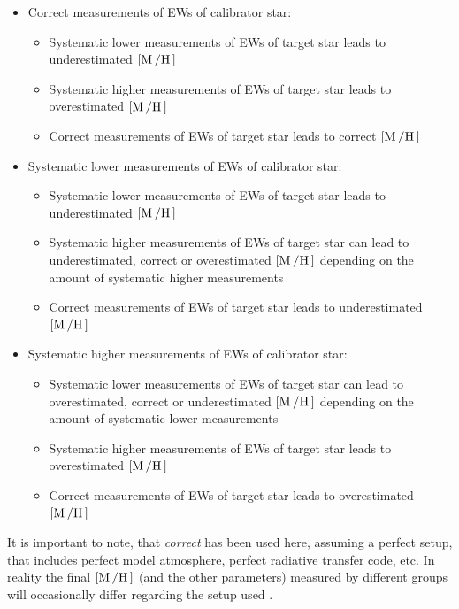 \begin{itemize}
  \item Correct measurements of EWs of calibrator star:
  \begin{itemize}
    \item Systematic lower measurements of EWs of target star leads to underestimated $[\ion{M}/\ion{H}]$
    \item Systematic higher measurements of EWs of target star leads to overestimated $[\ion{M}/\ion{H}]$
    \item Correct measurements of EWs of target star leads to correct $[\ion{M}/\ion{H}]$
  \end{itemize}
  \item Systematic lower measurements of EWs of calibrator star:
  \begin{itemize}
    \item Systematic lower measurements of EWs of target star leads to underestimated $[\ion{M}/\ion{H}]$
    \item Systematic higher measurements of EWs of target star can lead to underestimated, correct or
          overestimated $[\ion{M}/\ion{H}]$ depending on the amount of systematic higher measurements
    \item Correct measurements of EWs of target star leads to underestimated $[\ion{M}/\ion{H}]$
  \end{itemize}
  \item Systematic higher measurements of EWs of calibrator star:
  \begin{itemize}
    \item Systematic lower measurements of EWs of target star can lead to overestimated, correct or
          underestimated $[\ion{M}/\ion{H}]$ depending on the amount of systematic lower measurements
    \item Systematic higher measurements of EWs of target star leads to overestimated $[\ion{M}/\ion{H}]$
    \item Correct measurements of EWs of target star leads to overestimated $[\ion{M}/\ion{H}]$
  \end{itemize}
\end{itemize}
It is important to note, that \emph{correct} has been used here, assuming a perfect setup, that
includes perfect model atmosphere, perfect radiative transfer code, etc. In reality the final
$[\ion{M}/\ion{H}]$ (and the other parameters) measured by different groups will occasionally differ
regarding the setup used \citep[see e.g.][]{Hinkel2016}.

